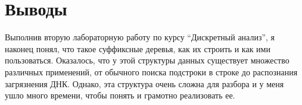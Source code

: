 \section{Выводы}


Выполнив вторую лабораторную работу по курсу \enquote{Дискретный анализ}, я наконец понял, что такое суффиксные деревья, как их строить и как ими пользоваться. Оказалось, что у этой структуры данных существует множество различных применений, от обычного поиска подстроки в строке до распознания загрязнения ДНК. Однако, эта структура очень сложна для разбора и у меня ушло много времени, чтобы понять и грамотно реализовать ее.
\pagebreak
